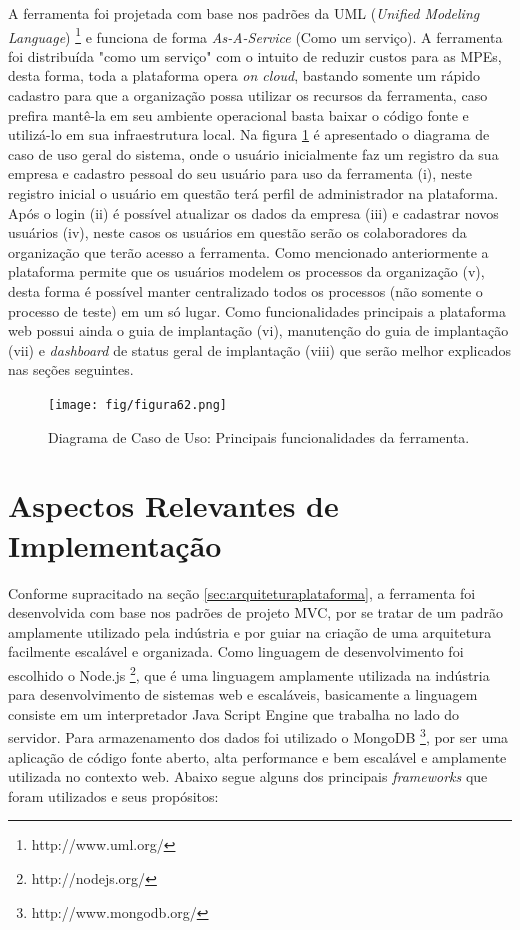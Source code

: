 A ferramenta foi projetada com base nos padrões da UML (\textit{Unified Modeling Language}) \footnote{http://www.uml.org/} e funciona de forma \textit{As-A-Service} (Como um serviço). A ferramenta foi distribuída "como um serviço" com o intuito de reduzir custos para as MPEs, desta forma, toda a plataforma opera \textit{on cloud}, bastando somente um rápido cadastro para que a organização possa utilizar os recursos da ferramenta, caso prefira mantê-la em seu ambiente operacional basta baixar o código fonte e utilizá-lo em sua infraestrutura local. Na figura \ref{fig:fig62} é apresentado o diagrama de caso de uso geral do sistema, onde o usuário inicialmente faz um registro da sua empresa e cadastro pessoal do seu usuário para uso da ferramenta (i), neste registro inicial o usuário em questão terá perfil de administrador na plataforma. Após o login (ii) é possível atualizar os dados da empresa (iii) e cadastrar novos usuários (iv), neste casos os usuários em questão serão os colaboradores da organização que terão acesso a ferramenta. Como mencionado anteriormente a plataforma permite que os usuários modelem os processos da organização (v), desta forma é possível manter centralizado todos os processos (não somente o processo de teste) em um só lugar. Como funcionalidades principais a plataforma web possui ainda o guia de implantação (vi), manutenção do guia de implantação (vii) e \textit{dashboard} de status geral de implantação (viii) que serão melhor explicados nas seções seguintes.

\begin{figure}[H]
\centering
\texttt{[image: fig/figura62.png]}
\caption{Diagrama de Caso de Uso: Principais funcionalidades da ferramenta.}
\label{fig:fig62}
\end{figure}

\section{Aspectos Relevantes de Implementação}
\label{sec:implementacaoplataforma}

Conforme supracitado na seção \ref{sec:arquiteturaplataforma}, a ferramenta foi desenvolvida com base nos padrões de projeto MVC, por se tratar de um padrão amplamente utilizado pela indústria e por guiar na criação de uma arquitetura facilmente escalável e organizada. Como linguagem de desenvolvimento foi escolhido o Node.js \footnote{http://nodejs.org/}, que é uma linguagem amplamente utilizada na indústria para desenvolvimento de sistemas web e escaláveis, basicamente a linguagem consiste em um interpretador Java Script Engine que trabalha no lado do servidor. Para armazenamento dos dados foi utilizado o MongoDB \footnote{http://www.mongodb.org/}, por ser uma aplicação de código fonte aberto, alta performance e bem escalável e amplamente utilizada no contexto web. Abaixo segue alguns dos principais \textit{frameworks} que foram utilizados e seus propósitos:


